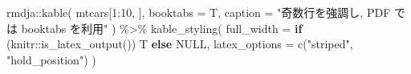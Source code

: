 \documentclass[
  xelatex,ja=standard,jafont=noto]{bxjsbook}
\newenvironment{Shaded}{\begin{snugshade}}{\end{snugshade}}
\newcommand{\AttributeTok}[1]{\textcolor[rgb]{0.77,0.63,0.00}{#1}}
\newcommand{\ConstantTok}[1]{\textcolor[rgb]{0.00,0.00,0.00}{#1}}
\newcommand{\ControlFlowTok}[1]{\textcolor[rgb]{0.13,0.29,0.53}{\textbf{#1}}}
\newcommand{\DecValTok}[1]{\textcolor[rgb]{0.00,0.00,0.81}{#1}}
\newcommand{\FunctionTok}[1]{\textcolor[rgb]{0.00,0.00,0.00}{#1}}
\newcommand{\NormalTok}[1]{#1}
\newcommand{\SpecialCharTok}[1]{\textcolor[rgb]{0.00,0.00,0.00}{#1}}
\newcommand{\StringTok}[1]{\textcolor[rgb]{0.31,0.60,0.02}{#1}}
\theoremstyle{definition}
\theoremstyle{definition}
\theoremstyle{definition}
\theoremstyle{definition}
\theoremstyle{remark}
\begin{document}
\begin{Shaded}
\begin{Highlighting}[numbers=left,,]
\NormalTok{rmdja}\SpecialCharTok{::}\FunctionTok{kable}\NormalTok{(}
\NormalTok{  mtcars[}\DecValTok{1}\SpecialCharTok{:}\DecValTok{10}\NormalTok{, ],}
  \AttributeTok{booktabs =}\NormalTok{ T,}
  \AttributeTok{caption =} \StringTok{"奇数行を強調し, PDF では \textasciigrave{}booktabs\textasciigrave{} を利用"}
\NormalTok{) }\SpecialCharTok{\%\textgreater{}\%}
  \FunctionTok{kable\_styling}\NormalTok{(}
    \AttributeTok{full\_width =} \ControlFlowTok{if}\NormalTok{ (knitr}\SpecialCharTok{::}\FunctionTok{is\_latex\_output}\NormalTok{()) T }\ControlFlowTok{else} \ConstantTok{NULL}\NormalTok{,}
    \AttributeTok{latex\_options =} \FunctionTok{c}\NormalTok{(}\StringTok{"striped"}\NormalTok{, }\StringTok{"hold\_position"}\NormalTok{)}
\NormalTok{  )}
\end{Highlighting}
\end{Shaded}
\end{document}
